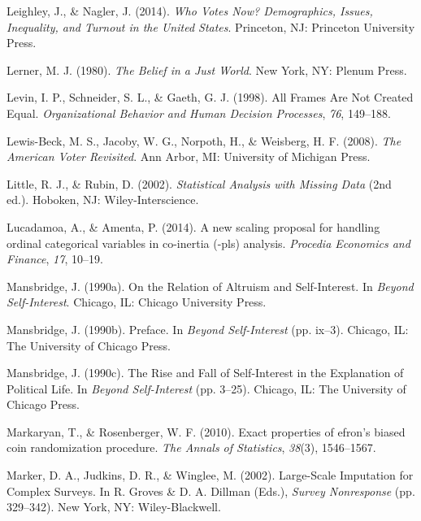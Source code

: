 \documentclass[12pt,econ]{sources/authesis}
\begin{document}
\leavevmode\hypertarget{ref-leighley_who_2014}{}%
Leighley, J., \& Nagler, J. (2014). \emph{Who Votes Now? Demographics, Issues, Inequality, and Turnout in the United States}. Princeton, NJ: Princeton University Press.

\leavevmode\hypertarget{ref-lerner_belief_1980}{}%
Lerner, M. J. (1980). \emph{The Belief in a Just World}. New York, NY: Plenum Press.

\leavevmode\hypertarget{ref-levin_1998_frames}{}%
Levin, I. P., Schneider, S. L., \& Gaeth, G. J. (1998). All Frames Are Not Created Equal. \emph{Organizational Behavior and Human Decision Processes}, \emph{76}, 149--188.

\leavevmode\hypertarget{ref-lewis-beck_2008_american}{}%
Lewis-Beck, M. S., Jacoby, W. G., Norpoth, H., \& Weisberg, H. F. (2008). \emph{The American Voter Revisited}. Ann Arbor, MI: University of Michigan Press.

\leavevmode\hypertarget{ref-little_2002_statistical}{}%
Little, R. J., \& Rubin, D. (2002). \emph{Statistical Analysis with Missing Data} (2nd ed.). Hoboken, NJ: Wiley-Interscience.

\leavevmode\hypertarget{ref-lucadamoa_2014_scaling}{}%
Lucadamoa, A., \& Amenta, P. (2014). A new scaling proposal for handling ordinal categorical variables in co-inertia (-pls) analysis. \emph{Procedia Economics and Finance}, \emph{17}, 10--19.

\leavevmode\hypertarget{ref-mansbridge_1990_relation}{}%
Mansbridge, J. (1990a). On the Relation of Altruism and Self-Interest. In \emph{Beyond Self-Interest}. Chicago, IL: Chicago University Press.

\leavevmode\hypertarget{ref-mansbridge_preface_1990}{}%
Mansbridge, J. (1990b). Preface. In \emph{Beyond Self-Interest} (pp. ix--3). Chicago, IL: The University of Chicago Press.

\leavevmode\hypertarget{ref-mansbridge_rise_1990}{}%
Mansbridge, J. (1990c). The Rise and Fall of Self-Interest in the Explanation of Political Life. In \emph{Beyond Self-Interest} (pp. 3--25). Chicago, IL: The University of Chicago Press.

\leavevmode\hypertarget{ref-markaryan_2010_exact}{}%
Markaryan, T., \& Rosenberger, W. F. (2010). Exact properties of efron's biased coin randomization procedure. \emph{The Annals of Statistics}, \emph{38}(3), 1546--1567.

\leavevmode\hypertarget{ref-marker_2002_large-scale}{}%
Marker, D. A., Judkins, D. R., \& Winglee, M. (2002). Large-Scale Imputation for Complex Surveys. In R. Groves \& D. A. Dillman (Eds.), \emph{Survey Nonresponse} (pp. 329--342). New York, NY: Wiley-Blackwell.
\end{document}
